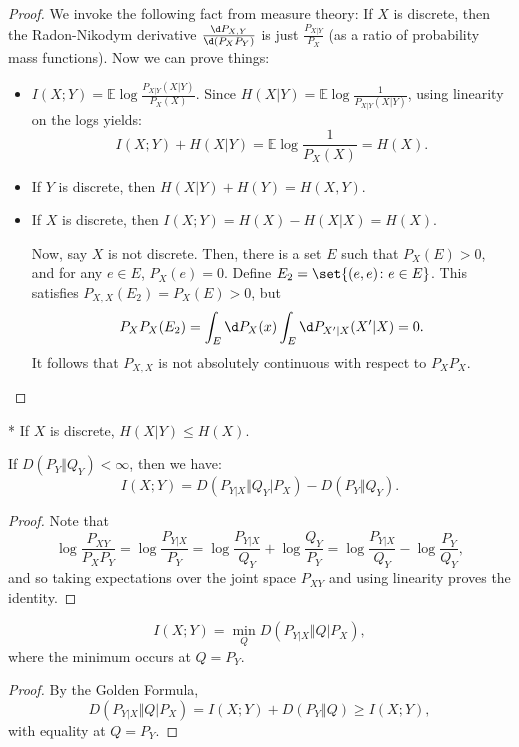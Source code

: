 \begin{proof}
	We invoke the following fact from measure theory: If $X$ is discrete, then the Radon-Nikodym derivative $\frac{\d P_{X,Y}}{\d (P_XP_Y)}$ is just $\frac{P_{X|Y}}{P_X}$ (as a ratio of probability mass functions). 
	Now we can prove things:
	\begin{itemize}
		\item $I(X;Y) = \mathbb E \log \frac{P_{X|Y}(X|Y)}{P_X(X)}$. Since $H(X|Y) = \mathbb E \log \frac{1}{P_{X|Y}(X|Y)}$, using linearity on the logs yields: \[
				I(X;Y) + H(X|Y) = \mathbb E\log \frac{1}{P_X(X)} = H(X).
			\]
		\item If $Y$ is discrete, then $H(X|Y) + H(Y) = H(X,Y)$.
		\item If $X$ is discrete, then $I(X;Y) = H(X) - H(X|X) = H(X)$. 

			Now, say $X$ is not discrete. Then, there is a set $E$ such that $P_X(E) > 0$, and for any $e\in E$, $P_X(e) = 0$.
			Define $E_2 = \set{(e,e)\colon e\in E}$. This satisfies $P_{X,X} (E_2) = P_X(E) > 0$, but \[
				P_XP_X(E_2) = \int_E \d P_X(x) \int_E \d P_{X'|X}(X'|X) = 0.
			\]
			It follows that $P_{X,X}$ is not absolutely continuous with respect to $P_XP_X$.
	\end{itemize}
\end{proof}

\begin{cor}*
	If $X$ is discrete, $H(X|Y) \leq H(X)$.
\end{cor}

\begin{thm}
	If $D(P_Y\Vert Q_Y) < \infty$, then we have: \[
		I(X;Y) = D(P_{Y|X} \Vert Q_Y |P_X) - D(P_Y\Vert Q_Y).
	\]
\end{thm}

\begin{proof}
	Note that \[
		\log \frac{P_{XY}}{P_XP_Y} = \log \frac{P_{Y|X}}{P_Y} = \log \frac{P_{Y|X}}{Q_Y} + \log \frac{Q_Y}{P_Y} = \log \frac{P_{Y|X}}{Q_Y} - \log \frac{P_Y}{Q_Y},
	\]
	and so taking expectations over the joint space $P_{XY}$ and using linearity proves the identity.
\end{proof}

\begin{cor}
	\[
		I(X;Y) = \min_Q D(P_{Y|X} \Vert Q|P_X),
	\]
	where the minimum occurs at $Q = P_Y$.
\end{cor}

\begin{proof}
	By the Golden Formula, \[
		D(P_{Y|X} \Vert Q|P_X) = I(X;Y) + D(P_Y\Vert Q) \geq I(X;Y),
	\]with equality at $Q = P_Y$.
\end{proof}

